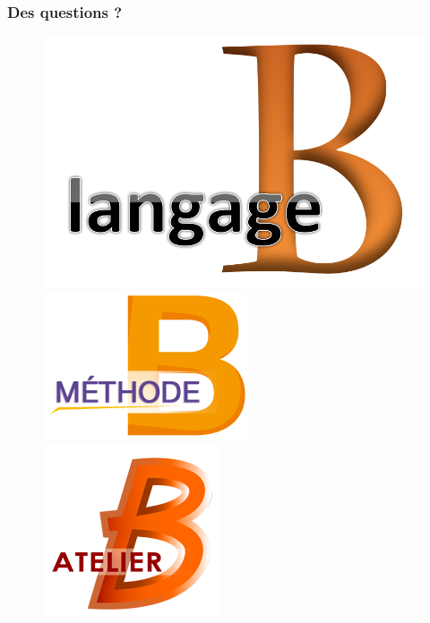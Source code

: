 \documentclass[11pt,a4paper,xcolor=table]{beamer} %
\begin{document}
\begin{frame}
\frametitle{Des questions ?}
\begin{figure}[h]
\centering
\includegraphics[scale=0.07]{ressources/logo2.png}
\hspace{1em}
\includegraphics[scale=0.22]{ressources/logo1.png}
\hspace{1em}
\includegraphics[scale=0.22]{ressources/logo.png}
\hspace{1em}
\fontsize{100}{0} \selectfont {?}
\end{figure}
\end{frame}
\end{document}
